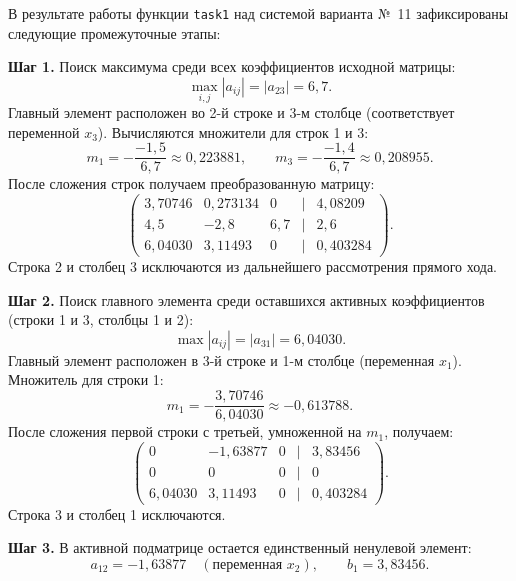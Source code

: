 В результате работы функции \texttt{task1} над системой варианта №~11 зафиксированы следующие промежуточные этапы:

\textbf{Шаг 1.} Поиск максимума среди всех коэффициентов исходной матрицы:
\begin{equation*}
    \max_{i, j} |a_{ij}| = |a_{23}| = 6{,}7.
\end{equation*}
Главный элемент расположен во 2-й строке и 3-м столбце (соответствует переменной $x_3$). Вычисляются множители для строк 1 и 3:
\begin{equation*}
    m_1 = -\frac{-1{,}5}{6{,}7} \approx 0{,}223881, \qquad m_3 = -\frac{-1{,}4}{6{,}7} \approx 0{,}208955.
\end{equation*}
После сложения строк получаем преобразованную матрицу:
\begin{equation*}
    \begin{pmatrix}
        3{,}70746 & 0{,}273134 & 0 & | & 4{,}08209 \\
        4{,}5 & -2{,}8 & 6{,}7 & | & 2{,}6 \\
        6{,}04030 & 3{,}11493 & 0 & | & 0{,}403284
    \end{pmatrix}.
\end{equation*}
Строка 2 и столбец 3 исключаются из дальнейшего рассмотрения прямого хода.

\textbf{Шаг 2.} Поиск главного элемента среди оставшихся активных коэффициентов (строки 1 и 3, столбцы 1 и 2):
\begin{equation*}
    \max |a_{ij}| = |a_{31}| = 6{,}04030.
\end{equation*}
Главный элемент расположен в 3-й строке и 1-м столбце (переменная $x_1$). Множитель для строки 1:
\begin{equation*}
    m_1 = -\frac{3{,}70746}{6{,}04030} \approx -0{,}613788.
\end{equation*}
После сложения первой строки с третьей, умноженной на $m_1$, получаем:
\begin{equation*}
    \begin{pmatrix}
        0 & -1{,}63877 & 0 & | & 3{,}83456 \\
        0 & 0 & 0 & | & 0 \\
        6{,}04030 & 3{,}11493 & 0 & | & 0{,}403284
    \end{pmatrix}.
\end{equation*}
Строка 3 и столбец 1 исключаются.

\textbf{Шаг 3.} В активной подматрице остается единственный ненулевой элемент:
\begin{equation*}
    a_{12} = -1{,}63877 \quad (\text{переменная } x_2), \qquad b_1 = 3{,}83456.
\end{equation*}


